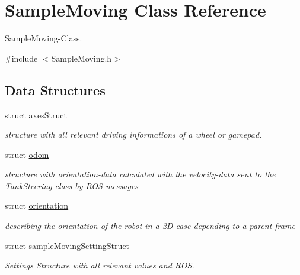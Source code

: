 \hypertarget{classSampleMoving}{\section{Sample\-Moving Class Reference}
\label{classSampleMoving}
}


Sample\-Moving-\/\-Class.  




{\ttfamily \#include $<$Sample\-Moving.\-h$>$}

\subsection*{Data Structures}
\begin{DoxyCompactItemize}
\item 
struct \hyperlink{structSampleMoving_1_1axesStruct}{axes\-Struct}
\begin{DoxyCompactList}\small\item\em structure with all relevant driving informations of a wheel or gamepad. \end{DoxyCompactList}\item 
struct \hyperlink{structSampleMoving_1_1odom}{odom}
\begin{DoxyCompactList}\small\item\em structure with orientation-\/data calculated with the velocity-\/data sent to the Tank\-Steering-\/class by R\-O\-S-\/messages \end{DoxyCompactList}\item 
struct \hyperlink{structSampleMoving_1_1orientation}{orientation}
\begin{DoxyCompactList}\small\item\em describing the orientation of the robot in a 2\-D-\/case depending to a parent-\/frame \end{DoxyCompactList}\item 
struct \hyperlink{structSampleMoving_1_1sampleMovingSettingStruct}{sample\-Moving\-Setting\-Struct}
\begin{DoxyCompactList}\small\item\em Settings Structure with all relevant values and R\-O\-S. \end{DoxyCompactList}\end{DoxyCompactItemize}
